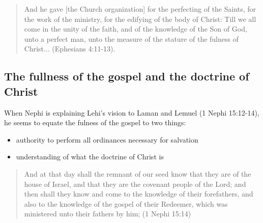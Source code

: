 \begin{quotation}
And he gave [the Church organization] for the perfecting of the Saints, for the work of the ministry, for the edifying of the body of Christ: Till we all come in the unity of the faith, and of the knowledge of the Son of God, unto a perfect man, unto the measure of the stature of the fulness of Christ... (Ephesians 4:11-13).
\end{quotation}

\subsection{The fullness of the gospel and the doctrine of Christ}
When Nephi is explaining Lehi's vision to Laman and Lemuel (1 Nephi 15:12-14), he seems to equate the fulness of the gospel to two things:
\begin{itemize}
  \item authority to perform all ordinances necessary for salvation
  \item understanding of what the doctrine of Christ is
\end{itemize}

\begin{quotation}
And at that day shall the remnant of our seed know that they are of the house of Israel, and that they are the covenant people of the Lord; and then shall they know and come to the knowledge of their forefathers, and also to the knowledge of the gospel of their Redeemer, which was ministered unto their fathers by him;  (1 Nephi 15:14)
\end{quotation}
